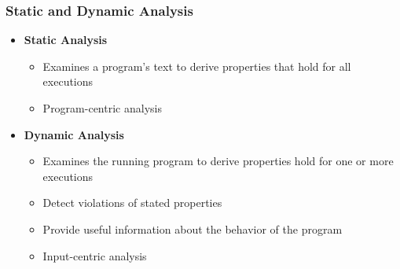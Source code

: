 \begin{frame}
	\frametitle{Static and Dynamic Analysis}
	\begin{itemize}
		\item \textbf{Static Analysis}
		\begin{itemize}
			\item Examines a program's text to derive properties that hold for all executions
			\item Program-centric analysis
		\end{itemize}
		\item \textbf{Dynamic Analysis}
		\begin{itemize}
			\item Examines the running program to derive properties hold for one or more executions
			\item Detect violations of stated properties
			\item Provide useful information about the behavior of the program
			\item Input-centric analysis
		\end{itemize}
	\end{itemize}
\end{frame}
